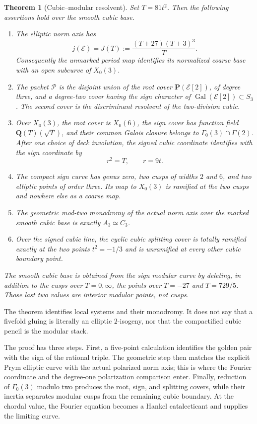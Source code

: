 \documentclass[11pt]{article}
\numberwithin{equation}{section}
\newtheorem{theorem}{Theorem}[section]
\theoremstyle{definition}
\theoremstyle{remark}
\newcommand{\Q}{\mathbf Q}
\newcommand{\PP}{\mathbf P}
\newcommand{\Gal}{\operatorname{Gal}}
\begin{document}
\begin{theorem}[Cubic--modular resolvent]\label{thm:main}
Set \(T=81t^2\).  Then the following assertions hold over the smooth cubic
base.
\begin{enumerate}
\item The elliptic norm axis has
\[
 j(\mathcal E)=J(T):=\frac{(T+27)(T+3)^3}{T}.
\]
Consequently the unmarked period map identifies its normalized coarse base
with an open subcurve of \(X_0(3)\).
\item The packet \(\mathscr P\) is the disjoint union of the root cover
\(\PP(\mathcal E[2])\), of degree three, and a degree-two cover having the
sign character of \(\Gal(\mathcal E[2])\subset S_3\).  The second cover is
the discriminant resolvent of the two-division cubic.
\item Over \(X_0(3)\), the root cover is \(X_0(6)\), the sign cover has
function field \(\Q(T)(\sqrt T)\), and their common Galois closure belongs to
\(\Gamma_0(3)\cap\Gamma(2)\).  After one choice of deck involution, the
signed cubic coordinate identifies with the sign coordinate by
\[
 r^2=T,\qquad r=9t.
\]
\item The compact sign curve has genus zero, two cusps of widths \(2\) and
\(6\), and two elliptic points of order three.  Its map to \(X_0(3)\) is
ramified at the two cusps and nowhere else as a coarse map.
\item The geometric mod-two monodromy of the actual norm axis over the marked
smooth cubic base is exactly \(A_3\simeq C_3\).
\item Over the signed cubic line, the cyclic cubic splitting cover is totally
ramified exactly at the two points \(t^2=-1/3\) and is unramified at every
other cubic boundary point.
\end{enumerate}
The smooth cubic base is obtained from the sign modular curve by deleting,
in addition to the cusps over \(T=0,\infty\), the points over
\(T=-27\) and \(T=729/5\).  Those last two values are interior modular
points, not cusps.
\end{theorem}

The theorem identifies local systems and their monodromy.  It does not say
that a fivefold gluing is literally an elliptic \(2\)-isogeny, nor that the
compactified cubic pencil is the modular stack.

The proof has three steps.  First, a five-point calculation identifies the
golden pair with the sign of the rational triple.  The geometric step then
matches the explicit Prym elliptic curve with the actual polarized norm axis;
this is where the Fourier coordinate and the degree-one polarization
comparison enter.  Finally, reduction of \(\Gamma_0(3)\) modulo two produces
the root, sign, and splitting covers, while their inertia separates modular
cusps from the remaining cubic boundary.  At the chordal value, the Fourier
equation becomes a Hankel catalecticant and supplies the limiting curve.
\end{document}
